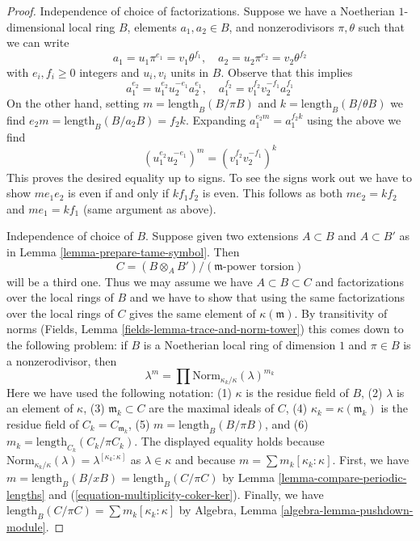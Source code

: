 \documentclass[10pt,a4paper]{amsart}
\theoremstyle{plain}
\theoremstyle{definition}
\theoremstyle{remark}
\numberwithin{equation}{subsection}
\begin{document}
\begin{proof}
Independence of choice of factorizations. Suppose we have
a Noetherian $1$-dimensional local ring $B$, elements $a_1, a_2 \in B$,
and nonzerodivisors $\pi, \theta$ such that we can write
$$
a_1 = u_1 \pi^{e_1} = v_1 \theta^{f_1},\quad
a_2 = u_2 \pi^{e_2} = v_2 \theta^{f_2}
$$
with $e_i, f_i \geq 0$ integers and $u_i, v_i$ units in $B$.
Observe that this implies
$$
a_1^{e_2} = u_1^{e_2}u_2^{-e_1}a_2^{e_1},\quad
a_1^{f_2} = v_1^{f_2}v_2^{-f_1}a_2^{f_1}
$$
On the other hand, setting
$m = \text{length}_B(B/\pi B)$ and $k = \text{length}_B(B/\theta B)$
we find $e_2 m = \text{length}_B(B/a_2 B) = f_2 k$.
Expanding $a_1^{e_2m} = a_1^{f_2 k}$ using the above we find
$$
(u_1^{e_2}u_2^{-e_1})^m =  (v_1^{f_2}v_2^{-f_1})^k
$$
This proves the desired equality up to signs. To see the signs
work out we have to show $me_1e_2$ is even if and only if
$kf_1f_2$ is even. This follows as both $me_2 = kf_2$ and
$me_1 = kf_1$ (same argument as above).

\medskip\noindent
Independence of choice of $B$. Suppose given two extensions
$A \subset B$ and $A \subset B'$ as in Lemma \ref{lemma-prepare-tame-symbol}.
Then
$$
C = (B \otimes_A B')/(\mathfrak m\text{-power torsion})
$$
will be a third one. Thus we may assume we have
$A \subset B \subset C$ and factorizations over the
local rings of $B$ and we have to show that using
the same factorizations over the local rings of $C$
gives the same element of $\kappa(\mathfrak m)$.
By transitivity of norms
(Fields, Lemma \ref{fields-lemma-trace-and-norm-tower})
this comes down to the following problem:
if $B$ is a Noetherian local ring of dimension $1$
and $\pi \in B$ is a nonzerodivisor, then
$$
\lambda^m = \prod \text{Norm}_{\kappa_k/\kappa}(\lambda)^{m_k}
$$
Here we have used the following notation:
(1) $\kappa$ is the residue field of $B$,
(2) $\lambda$ is an element of $\kappa$,
(3) $\mathfrak m_k \subset C$ are the maximal ideals of $C$,
(4) $\kappa_k = \kappa(\mathfrak m_k)$ is the residue field of
$C_k = C_{\mathfrak m_k}$,
(5) $m = \text{length}_B(B/\pi B)$, and
(6) $m_k = \text{length}_{C_k}(C_k/\pi C_k)$.
The displayed equality holds because
$\text{Norm}_{\kappa_k/\kappa}(\lambda) = \lambda^{[\kappa_k : \kappa]}$
as $\lambda \in \kappa$ and because $m = \sum m_k[\kappa_k:\kappa]$.
First, we have $m = \text{length}_B(B/xB) = \text{length}_B(C/\pi C)$
by Lemma \ref{lemma-compare-periodic-lengths} 
and (\ref{equation-multiplicity-coker-ker}).
Finally, we have $\text{length}_B(C/\pi C) = \sum m_k[\kappa_k:\kappa]$
by Algebra, Lemma \ref{algebra-lemma-pushdown-module}.
\end{proof}
\end{document}
